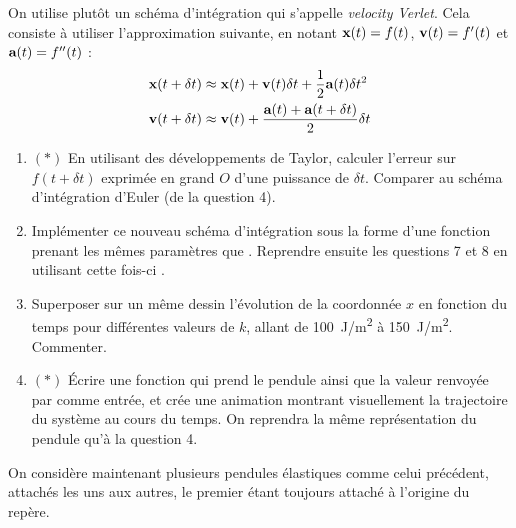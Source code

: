 \documentclass{article}
\begin{document}
On utilise plutôt un schéma d'intégration qui s'appelle \textit{velocity Verlet}. Cela consiste à utiliser l'approximation suivante, en notant $\textbf x(t) = f(t)$, $\textbf v(t) = f'(t)$ et $\textbf a(t) = f''(t)$ :
\[\begin{split}
	\textbf x(t + \delta t) &\approx \textbf x(t) + \textbf v(t)\delta t + \frac12 \textbf a(t)\delta t^2\\
	\textbf v(t + \delta t) &\approx \textbf v(t) + \frac{\textbf a(t) + \textbf a(t+\delta t)}2\delta t
\end{split}\]

\begin{enumerate}[resume]
	\item $(*)$ En utilisant des développements de Taylor, calculer l'erreur sur $f(t+\delta t)$ exprimée en grand $O$ d'une puissance de $\delta t$. Comparer au schéma d'intégration d'Euler (de la question 4).
	\item Implémenter ce nouveau schéma d'intégration sous la forme d'une fonction  prenant les mêmes paramètres que . Reprendre ensuite les questions 7 et 8 en utilisant cette fois-ci .
	\item Superposer sur un même dessin l'évolution de la coordonnée $x$ en fonction du temps pour différentes valeurs de $k$, allant de \qty{100}{J/m^2} à \qty{150}{J/m^2}. Commenter.
	\item $(*)$ Écrire une fonction  qui prend le pendule ainsi que la valeur renvoyée par  comme entrée, et crée une animation montrant visuellement la trajectoire du système au cours du temps. On reprendra la même représentation du pendule qu'à la question 4.
\end{enumerate}

On considère maintenant plusieurs pendules élastiques comme celui précédent, attachés les uns aux autres, le premier étant toujours attaché à l'origine du repère.
\end{document}
